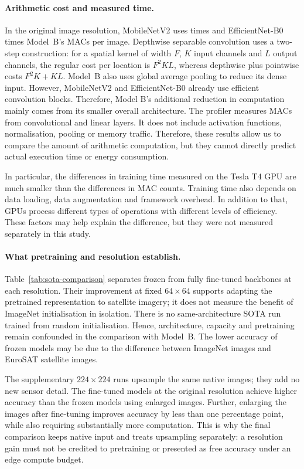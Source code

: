 \paragraph{Arithmetic cost and measured time.}
In the original image resolution, MobileNetV2 uses \FinalMobileMACRatio{} times and
EfficientNet-B0 \FinalEfficientMACRatio{} times Model~B's MACs per image.
Depthwise separable convolution uses a two-step construction: for a spatial
kernel of width $F$, $K$ input channels and $L$ output channels, the regular
cost per location is $F^2KL$, whereas depthwise plus pointwise costs
$F^2K+KL$. Model~B also uses global average
pooling to reduce its dense input. However, MobileNetV2 and EfficientNet-B0 
already use efficient convolution blocks. Therefore, Model B's additional 
reduction in computation mainly comes from its smaller overall architecture.
The profiler measures MACs from convolutional and linear layers. It does not 
include activation functions, normalisation, pooling or memory traffic. 
Therefore, these results allow us to compare the amount of arithmetic 
computation, but they cannot directly predict actual execution time 
or energy consumption.

In particular, the differences in training time measured on the Tesla 
T4 GPU are much smaller than the differences in MAC counts.
Training time also depends on data loading, data augmentation
and framework overhead. In addition to that, GPUs process different types of
operations with different levels of efficiency. These factors may help  
explain the difference, but they were not measured separately in this study.

\paragraph{What pretraining and resolution establish.}
Table~\ref{tab:sota-comparison} separates frozen from fully fine-tuned
backbones at each resolution. Their improvement at fixed $64\times64$
supports adapting the pretrained representation to satellite imagery;
it does not measure the benefit of ImageNet initialisation in isolation.
There is no same-architecture SOTA run trained from random initialisation.
Hence, architecture, capacity and pretraining remain confounded in the comparison
with Model~B. The lower accuracy of frozen models may be due to the difference 
between ImageNet images and EuroSAT satellite images. 

The supplementary $224\times224$ runs upsample the same native images;
they add no new sensor detail. The fine-tuned models at the original 
resolution achieve higher accuracy than the frozen models using enlarged 
images. Further, enlarging the images after fine-tuning improves 
accuracy by less than one percentage point, while also requiring substantially 
more computation. This is why the final comparison keeps native input and treats
upsampling separately: a resolution gain must not be credited to pretraining
or presented as free accuracy under an edge compute budget.

